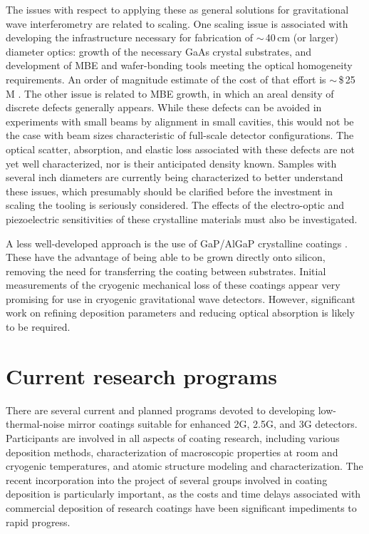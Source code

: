 The issues with respect to applying these as general solutions for gravitational wave interferometry are related to scaling. One scaling issue is associated with developing the infrastructure necessary for fabrication of $\mathrm{\sim}$\,40\,cm (or larger) diameter optics: growth of the necessary GaAs crystal substrates, and development of MBE and wafer-bonding tools meeting the optical homogeneity requirements. An order of magnitude estimate of the cost of that effort is $\mathrm{\sim}$\,\$\,25\,M \cite{Cole2018AlGaAsCost}. The other issue is related to MBE growth, in which an areal density of discrete defects generally appears. While these defects can be avoided in experiments with small beams by alignment in small cavities, this would not be the case with beam sizes characteristic of full-scale detector configurations. The optical scatter, absorption, and elastic loss associated with these defects are not yet well characterized, nor is their anticipated density known. Samples with several inch diameters are currently being characterized to better understand these issues, which presumably should be clarified before the investment in scaling the tooling is seriously considered. The effects of the electro-optic and piezoelectric sensitivities of these crystalline materials must also be investigated. 

A less well-developed approach is the use of GaP/AlGaP crystalline coatings \cite{lin2015epitaxial}. These have the advantage of being able to be grown directly onto silicon, removing the need for transferring the coating between substrates. Initial measurements of the cryogenic mechanical loss of these coatings appear very promising for use in cryogenic gravitational wave detectors. However, significant work on refining deposition parameters and reducing optical absorption is likely to be required.

\section{Current research programs}

There are several current and planned programs devoted to developing low-thermal-noise mirror coatings suitable for enhanced 2G, 2.5G, and 3G detectors. Participants are involved in all aspects of coating research, including various deposition methods, characterization of macroscopic properties at room and cryogenic temperatures, and atomic structure modeling and characterization. The recent incorporation into the project of several groups involved in coating deposition is particularly important, as the costs and time delays associated with commercial deposition of research coatings have been significant impediments to rapid progress.

